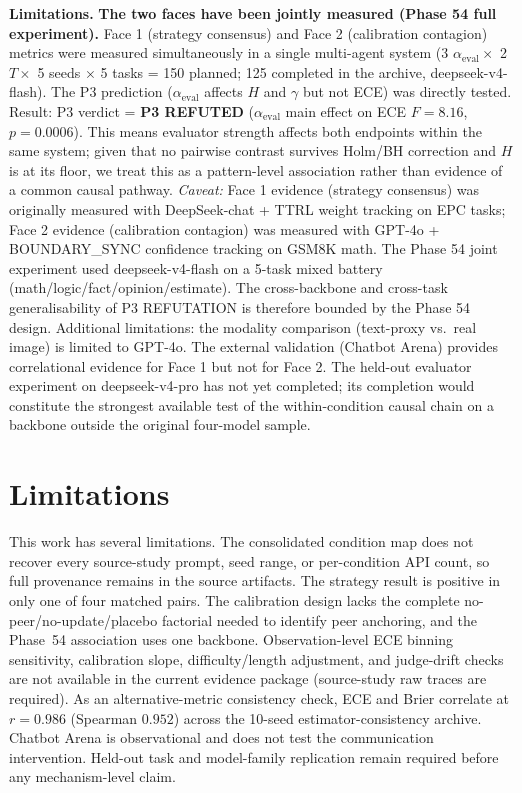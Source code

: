 \documentclass[11pt]{article}
\begin{document}
\textbf{Limitations.} \textbf{The two faces have been jointly measured (Phase 54 full experiment).} Face 1 (strategy consensus) and Face 2 (calibration contagion) metrics were measured simultaneously in a single multi-agent system (3 $\alpha_{\text{eval}} \times$ 2 $T \times$ 5 seeds $\times$ 5 tasks = 150 planned; 125 completed in the archive, deepseek-v4-flash). The P3 prediction ($\alpha_{\text{eval}}$ affects $H$ and $\gamma$ but not ECE) was directly tested. Result: P3 verdict = \textbf{P3 REFUTED} ($\alpha_{\text{eval}}$ main effect on ECE $F = 8.16$, $p = 0.0006$). This means evaluator strength affects both endpoints within the same system; given that no pairwise contrast survives Holm/BH correction and $H$ is at its floor, we treat this as a pattern-level association rather than evidence of a common causal pathway. \emph{Caveat:} Face 1 evidence (strategy consensus) was originally measured with DeepSeek-chat + TTRL weight tracking on EPC tasks; Face 2 evidence (calibration contagion) was measured with GPT-4o + BOUNDARY\_SYNC confidence tracking on GSM8K math. The Phase 54 joint experiment used deepseek-v4-flash on a 5-task mixed battery (math/logic/fact/opinion/estimate). The cross-backbone and cross-task generalisability of P3 REFUTATION is therefore bounded by the Phase 54 design. Additional limitations: the modality comparison (text-proxy vs.\ real image) is limited to GPT-4o. The external validation (Chatbot Arena) provides correlational evidence for Face 1 but not for Face 2. The held-out evaluator experiment on deepseek-v4-pro has not yet completed; its completion would constitute the strongest available test of the within-condition causal chain on a backbone outside the original four-model sample.

\section{Limitations}
This work has several limitations. The consolidated condition map does not recover every source-study prompt, seed range, or per-condition API count, so full provenance remains in the source artifacts. The strategy result is positive in only one of four matched pairs. The calibration design lacks the complete no-peer/no-update/placebo factorial needed to identify peer anchoring, and the Phase~54 association uses one backbone. Observation-level ECE binning sensitivity, calibration slope, difficulty/length adjustment, and judge-drift checks are not available in the current evidence package (source-study raw traces are required). As an alternative-metric consistency check, ECE and Brier correlate at $r = 0.986$ (Spearman $0.952$) across the 10-seed estimator-consistency archive. Chatbot Arena is observational and does not test the communication intervention. Held-out task and model-family replication remain required before any mechanism-level claim.
\end{document}
